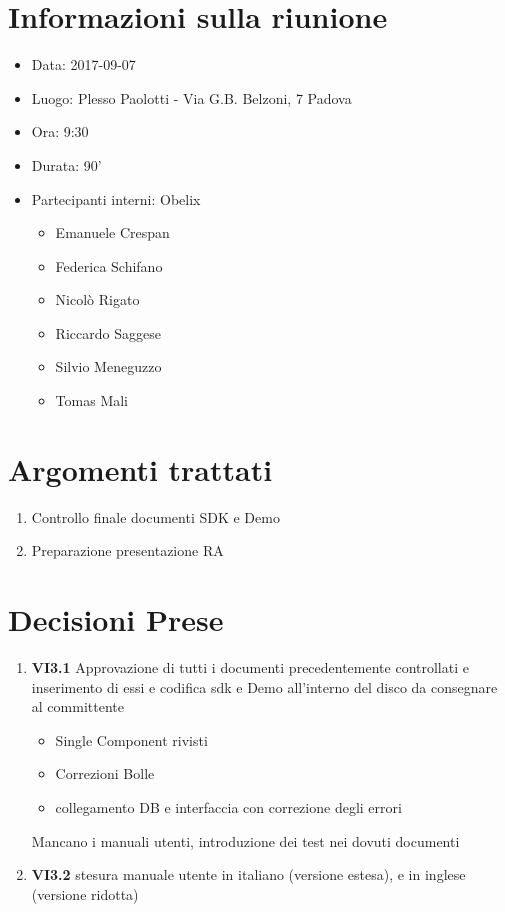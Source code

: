 \documentclass[10 pt,a4paper, openany]{article}
\date{}
\begin{document}
\paginatitolo
\section{Informazioni sulla riunione}

\begin{itemize}
\item[] Data: 2017-09-07
\item[] Luogo: Plesso Paolotti - Via G.B. Belzoni, 7 Padova 
\item[] Ora: 9:30
\item[] Durata: 90'
\item[] Partecipanti interni: Obelix
  \begin{itemize}
  \item[] Emanuele Crespan
  \item[] Federica Schifano
  \item[] Nicolò Rigato
  \item[] Riccardo Saggese
  \item[] Silvio Meneguzzo
  \item[] Tomas Mali
 \end{itemize}
\end{itemize}

\section{Argomenti trattati}
\begin{enumerate}
	\item Controllo finale documenti SDK e Demo
	\item Preparazione presentazione RA


	
\end{enumerate}


\section{Decisioni Prese}
\begin{enumerate}
	\item \textbf{VI3.1} Approvazione di tutti i documenti precedentemente controllati e inserimento di essi e codifica sdk e Demo all'interno del disco da consegnare al committente 
	\begin{itemize}
		\item Single Component rivisti
		\item Correzioni Bolle 
		\item collegamento DB e interfaccia con correzione degli errori
	\end{itemize}
	Mancano i manuali utenti, introduzione dei test nei dovuti documenti
	
	\item \textbf{VI3.2} stesura manuale utente in italiano (versione estesa), e in inglese (versione ridotta)
	
		
	
\end{enumerate}
\end{document}
